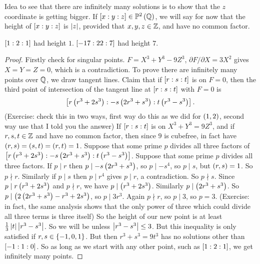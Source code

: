 Idea to see that there are infinitely many solutions is to show that the $ z $ coordinate is getting bigger. If $ \sb{x : y : z} \in \P^2\rb{\Q} $, we will say for now that the height of $ \sb{x : y : z} $ is $ \abs{z} $, provided that $ x, y, z \in \Z $, and have no common factor.

\begin{example*}
$ \sb{1 : 2 : 1} $ had height $ 1 $. $ \sb{-17 : 22 : 7} $ had height $ 7 $.
\end{example*}

\begin{proof}
Firstly check for singular points. $ F = X^3 + Y^3 - 9Z^3 $, $ \partial F / \partial X = 3X^2 $ gives $ X = Y = Z = 0 $, which is a contradiction. To prove there are infinitely many points over $ \Q $, we draw tangent lines. Claim that if $ \sb{r : s : t} $ is on $ F = 0 $, then the third point of intersection of the tangent line at $ \sb{r : s : t} $ with $ F = 0 $ is
$$ \sb{r\rb{r^3 + 2s^3} : -s\rb{2r^3 + s^3} : t\rb{r^3 - s^3}}. $$
(Exercise: check this in two ways, first way do this as we did for $ \rb{1, 2} $, second way use that I told you the answer) If $ \sb{r : s : t} $ is on $ X^3 + Y^3 = 9Z^3 $, and if $ r, s, t \in \Z $ and have no common factor, then since $ 9 $ is cubefree, in fact have $ \rb{r, s} = \rb{s, t} = \rb{r, t} = 1 $. Suppose that some prime $ p $ divides all three factors of $ \sb{r\rb{r^3 + 2s^3} : -s\rb{2r^3 + s^3} : t\rb{r^3 - s^3}} $. Suppose that some prime $ p $ divides all three factors. If $ p \mid r $ then $ p \mid -s\rb{2r^3 + s^3} $, so $ p \mid -s^4 $, so $ p \mid s $, but $ \rb{r, s} = 1 $. So $ p \nmid r $. Similarly if $ p \mid s $ then $ p \mid r^4 $ gives $ p \mid r $, a contradiction. So $ p \nmid s $. Since $ p \mid r\rb{r^3 + 2s^3} $ and $ p \nmid r $, we have $ p \mid \rb{r^3 + 2s^3} $. Similarly $ p \mid \rb{2r^3 + s^3} $. So $ p \mid \rb{2\rb{2r^3 + s^3} - r^3 + 2s^3} $, so $ p \mid 3r^3 $. Again $ p \nmid r $, so $ p \mid 3 $, so $ p = 3 $. (Exercise: in fact, the same analysis shows that the only power of three which could divide all three terms is three itself) So the height of our new point is at least $ \tfrac{1}{3}\abs{t}\abs{r^3 - s^3} $. So we will be unless $ \abs{r^3 - s^3} \le 3 $. But this inequality is only satisfied if $ r, s \in \cb{-1, 0, 1} $. But then $ r^3 + s^3 = 9t^3 $ has no solutions other than $ \sb{-1 : 1 : 0} $. So as long as we start with any other point, such as $ \sb{1 : 2 : 1} $, we get infinitely many points.
\end{proof}


